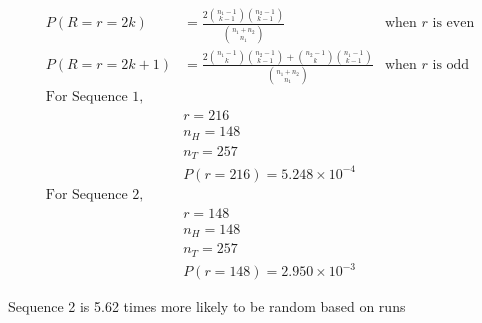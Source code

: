 \documentclass{article} %
\begin{document}
\begin{enumerate}
	\begin{align*}
	P(R = r = 2k) &= \frac{2 \binom{n_1-1}{k-1} \binom{n_2-1}{k-1}}{\binom{n_1+n_2}{n_1}} &\text{when } r \text{ is even}\\
	P(R = r = 2k + 1) &= \frac{2 \binom{n_1-1}{k} \binom{n_2-1}{k-1} + \binom{n_2-1}{k} \binom{n_1-1}{k-1}}{\binom{n_1+n_2}{n_1}} &\text{when } r \text{ is odd}\\
	\text{For Sequence 1,}\\
	&r = 216\\
	&n_H = 148\\
	&n_T = 257\\
	&P(r = 216) = 5.248 \times 10^{-4}\\
	\text{For Sequence 2,}\\
	&r = 148\\
	&n_H = 148\\
	&n_T = 257\\
	&P(r = 148) = 2.950 \times 10^{-3}
	\end{align*}
	
	Sequence 2 is 5.62 times more likely to be random based on runs
	
\end{enumerate}
\end{document}
